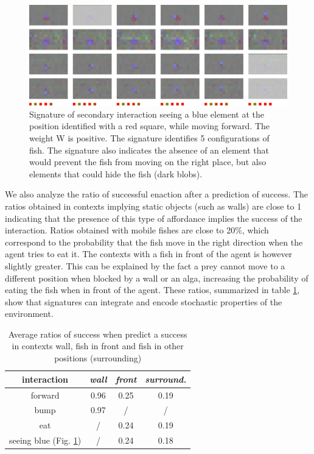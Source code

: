 \documentclass[conference]{IEEEtran}
\begin{document}
\begin{figure}[t]
\centerline{\includegraphics[scale=0.32]{img/sig_blue.pdf}}
\caption{Signature of secondary interaction seeing a blue element at the position identified with a red square, while moving forward. The weight W is positive. The signature identifies 5 configurations of fish. The signature also indicates the absence of an element that would prevent the fish from moving on the right place, but also elements that could hide the fish (dark blobs).}
\label{fig:sigblue}
\end{figure}


We also analyze the ratio of successful enaction after a prediction of success. The ratios obtained in contexts implying static objects (such as walls) are close to 1 indicating that the presence of this type of affordance implies the success of the interaction. Ratios obtained with mobile fishes are close to 20\%, which correspond to the probability that the fish move in the right direction when the agent tries to eat it. The contexts with a fish in front of the agent is however slightly greater. This can be explained by the fact a prey cannot move to a different position when blocked by a wall or an alga, increasing the probability of eating the fish when in front of the agent. These ratios, summarized in table \ref{tab1}, show that signatures can integrate and encode stochastic properties of the environment.


\begin{table}[htbp]
\caption{Average ratios of success when predict a success in contexts wall, fish in front and fish in other positions (surrounding)}
\begin{center}
\begin{tabular}{|c|c|c|c|}
\hline
\textbf{interaction} & \textbf{\textit{wall}}& \textbf{\textit{front}} & \textbf{\textit{surround.}}\\
\hline
forward & 0.96 & 0.25 & 0.19 \\
\hline
bump    & 0.97 & /    &  / \\
\hline
eat & / & 0.24 & 0.19 \\
\hline
seeing blue (Fig. \ref{fig:sigblue}) & / & 0.24 & 0.18 \\
\hline
\end{tabular}
\label{tab1}
\end{center}
\end{table}
\end{document}
